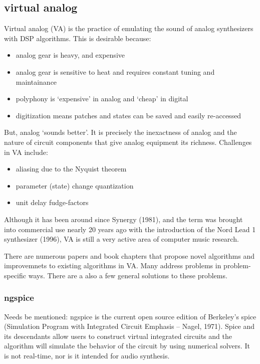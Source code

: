 \documentclass{article}
\begin{document}
\subsection{virtual analog}
Virtual analog (VA) is the practice of emulating the sound of analog synthesizers with DSP algorithms. This is desirable because: 
\begin{itemize}
\item analog gear is heavy, and expensive
\item analog gear is sensitive to heat and requires constant tuning and maintainance
\item polyphony is `expensive' in analog and `cheap' in digital
\item digitization means patches and states can be saved and easily re-accessed
\end{itemize}
But, analog `sounds better'. It is precisely the inexactness of analog and the nature of circuit components that give analog equipment its richness. Challenges in VA include:
\begin{itemize}
\item aliasing due to the Nyquist theorem
\item parameter (state) change quantization
\item unit delay fudge-factors
\end{itemize}
Although it has been around since Synergy (1981), and the term was brought into commercial use nearly 20 years ago with the introduction of the Nord Lead 1 synthesizer (1996), VA is still a very active area of computer music research.

There are numerous papers and book chapters that propose novel algorithms and improvemnets to existing algorithms in VA. Many address problems in problem-specific ways. There are a also a few general solutions to these problems.

\subsubsection{ngspice}
Needs be mentioned: ngspice is the current open source edition of Berkeley's spice (Simulation Program with Integrated Circuit Emphasis -- Nagel, 1971). Spice and its descendants allow users to construct virtual integrated circuits and the algorithm will simulate the behavior of the circuit by using numerical solvers. It is not real-time, nor is it intended for audio synthesis.
\end{document}
